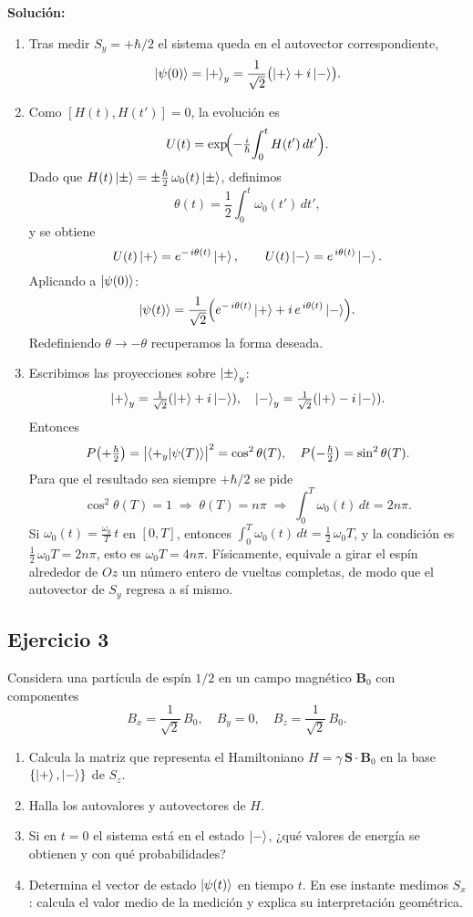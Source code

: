 \documentclass[a4paper,11pt]{article}
\begin{document}
\textbf{Solución:}
\begin{enumerate}
  \item Tras medir $S_y=+\hbar/2$ el sistema queda en el autovector correspondiente,
    \[
      \ket{\psi(0)} = \ket{+}_y
      = \frac{1}{\sqrt{2}}\bigl(\ket{+} + i\ket{-}\bigr).
    \]
  \item Como $[H(t),H(t')]=0$, la evolución es
    \[
      U(t)
      = \exp\!\Bigl(-\tfrac{i}{\hbar}\!\int_0^tH(t')\,dt'\Bigr).
    \]
    Dado que 
    $H(t)\ket{\pm}=\pm\frac{\hbar}{2}\,\omega_0(t)\ket{\pm}$, definimos
    \[
      \theta(t)=\frac{1}{2}\int_0^t\omega_0(t')\,dt',
    \]
    y se obtiene
    \[
      U(t)\ket{+}=e^{-\,i\theta(t)}\ket{+},\qquad
      U(t)\ket{-}=e^{\,i\theta(t)}\ket{-}.
    \]
    Aplicando a $\ket{\psi(0)}$:
    \[
      \ket{\psi(t)}
      =\frac{1}{\sqrt{2}}\Bigl(e^{-\,i\theta(t)}\ket{+}
        +i\,e^{\,i\theta(t)}\ket{-}\Bigr).
    \]
    Redefiniendo $\theta\to-\theta$ recuperamos la forma deseada.
  \item Escribimos las proyecciones sobre $\ket{\pm}_y$:
    \[
      \ket{+}_y=\tfrac1{\sqrt2}(\ket{+}+i\ket{-}),\quad
      \ket{-}_y=\tfrac1{\sqrt2}(\ket{+}-i\ket{-}).
    \]
    Entonces
    \[
      P\bigl(+\tfrac{\hbar}{2}\bigr)
      =\bigl|\braket{+_y|\psi(T)}\bigr|^2
      =\cos^2\theta(T),
      \quad
      P\bigl(-\tfrac{\hbar}{2}\bigr)=\sin^2\theta(T).
    \]
    Para que el resultado sea siempre $+\hbar/2$ se pide
    \[
      \cos^2\theta(T)=1
      \;\Longrightarrow\;
      \theta(T)=n\pi
      \;\Longrightarrow\;
      \int_0^T\omega_0(t)\,dt=2n\pi.
    \]
    Si $\omega_0(t)=\tfrac{\omega_0}{T}\,t$ en $[0,T]$, entonces
    $\int_0^T\omega_0(t)\,dt=\tfrac12\,\omega_0T$, y la condición es
    $\tfrac12\,\omega_0T=2n\pi$, esto es $\omega_0T=4n\pi$.  
    Físicamente, equivale a girar el espín alrededor de $Oz$ un número entero
    de vueltas completas, de modo que el autovector de $S_y$ regresa a sí mismo.
\end{enumerate}

\subsection*{Ejercicio 3}
Considera una partícula de espín $1/2$ en un campo magnético $\mathbf{B}_0$ con componentes
\[
  B_x=\frac{1}{\sqrt{2}}\,B_0,\quad B_y=0,\quad B_z=\frac{1}{\sqrt{2}}\,B_0.
\]
\begin{enumerate}
  \item Calcula la matriz que representa el Hamiltoniano $H=\gamma\,\mathbf{S}\cdot\mathbf{B}_0$ en la base $\{\ket{+},\ket{-}\}$ de $S_z$.
  \item Halla los autovalores y autovectores de $H$.
  \item Si en $t=0$ el sistema está en el estado $\ket{-}$, ¿qué valores de energía se obtienen y con qué probabilidades?
  \item Determina el vector de estado $\ket{\psi(t)}$ en tiempo $t$. En ese instante medimos $S_x$: calcula el valor medio de la medición y explica su interpretación geométrica.
\end{enumerate}
\end{document}
